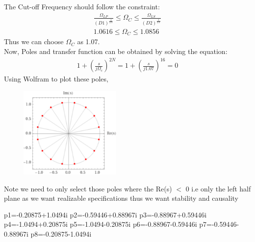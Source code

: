 \documentclass[12pt]{article}
\begin{document}
	\noindent The Cut-off Frequency should follow the constraint:
	\begin{gather*}
		\frac{\Omega_{LP}}{(D1)^{\frac{1}{2N}}} \le \Omega_C \le \frac{\Omega_{LS}}{(D2)^{\frac{1}{2N}}} \\	
		1.0616 \le \Omega_C \le 1.0856
	\end{gather*}
	Thus we can choose $\Omega_C$ as 1.07.\\
	Now, Poles and transfer function can be obtained by solving the equation:
	\begin{gather*}
		1 + \left(\frac{s}{j\Omega_c}\right)^{2N} = 1 + \left(\frac{s}{j1.07}\right)^{16} = 0
	\end{gather*} 
	Using Wolfram to plot these poles,
	\begin{figure}[H]
		\centering
		\includegraphics[width = 5cm]{Butterworthpoles.png}
	\end{figure}
	\noindent Note we need to only select those poles where the Re(s) $<$ 0 i.e only the left half plane as we want realizable specifications thus we want stability and causality
	\begin{verbatim*}	
		p1=-0.20875+1.0494i
		p2=-0.59446+0.88967i
		p3=-0.88967+0.59446i
		p4=-1.0494+0.20875i
		p5=-1.0494-0.20875i
		p6=-0.88967-0.59446i
		p7=-0.59446-0.88967i
		p8=-0.20875-1.0494i
	\end{verbatim*}
	
\end{document}
